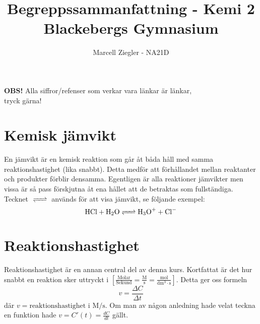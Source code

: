 \documentclass[12pt]{article}
\title{Begreppssammanfattning - Kemi 2 \\ Blackebergs Gymnasium}
\author{Marcell Ziegler - NA21D}
\theoremstyle{definition}
\begin{document}
    \begin{titlepage}
        \maketitle
        \vfill
        
        \begin{center}
            \textbf{OBS!} Alla siffror/refenser som verkar vara länkar är länkar, \\ tryck gärna!
        \end{center}
    \end{titlepage}

    \tableofcontents

    \newpage

    \part{Kemisk jämvikt}
    
    En jämvikt är en kemisk reaktion som går åt båda håll med samma reaktionshastighet (lika snabbt). Detta medför att förhållandet mellan reaktanter och produkter förblir densamma. Egentligen är alla reaktioner jämvikter men vissa är så pass förskjutna åt ena hållet att de betraktas som fullständiga. Tecknet $\ce{<=>}$ används för att visa jämvikt, se följande exempel:
    \begin{equation*}
        \ce{HCl + H2O <=> H3O+ + Cl-}
    \end{equation*}

    
    \setcounter{exm}{0}
    
    \setcounter{exm}{0}

    \pagebreak

    \part{Reaktionshastighet}

    Reaktionshastighet är en annan central del av denna kurs. Kortfattat är det hur snabbt en reaktion sker uttryckt i $\mathrm{\left[\frac{Molar}{Sekund} = \frac{M}{s} = \frac{mol}{dm^3 \cdot s}\right]}$. Detta ger oss formeln 
    \begin{equation*}
        v = \frac{\Delta C}{\Delta t} 
    \end{equation*}
    där $v = \text{reaktionshastighet i } \mathrm{M/s}$. Om man av någon anledning hade velat teckna en funktion hade $v = C'(t) = \frac{dC}{dt}$ gällt.
\end{document}
